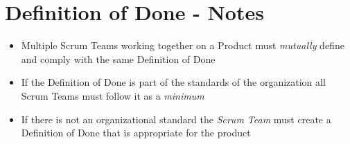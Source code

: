 \documentclass[a4paper,11pt,twocolumn]{article}
\begin{document}
\section*{Definition of Done - Notes}
\begin{itemize}
	\item Multiple Scrum Teams working together on a Product must \textit{mutually} define and comply with the same Definition of Done
	\item If the Definition of Done is part of the standards of the organization all Scrum Teams must follow it as a \textit{minimum}
	\item If there is not an organizational standard the \textit{Scrum Team} must create a Definition of Done that is appropriate for the product
\end{itemize}

\nocite{*}


\end{document}
